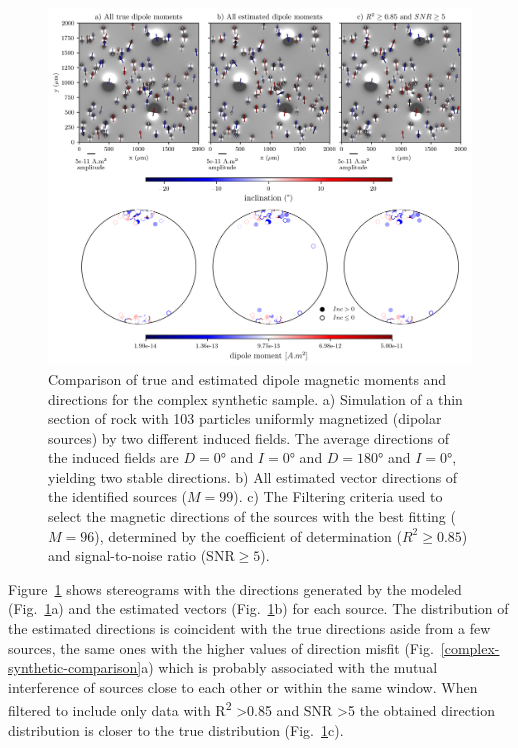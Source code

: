 \begin{figure}[tb!]
\centering
\includegraphics[width=1\linewidth]{figures/complex-synthetic-stereograms.png}
\caption{ Comparison of true and estimated dipole magnetic moments and directions for the complex synthetic sample.
a) Simulation of a thin section of rock with 103 particles uniformly magnetized (dipolar sources) by two different induced fields. The average directions of the induced fields are $D=\ang{0}$ and $I=\ang{0}$ and $D=\ang{180}$ and $I=\ang{0}$, yielding two stable directions. b) All estimated vector directions of the identified sources ($M=99$). c) The Filtering criteria used to select the magnetic directions of the sources with the best fitting ($M=96$), determined by the coefficient of determination ($R^2 \geq 0.85$) and signal-to-noise ratio ($\text{SNR} \geq 5$).
}
\label{complex-synthetic-stereograms}
\end{figure}

Figure~\ref{complex-synthetic-stereograms} shows stereograms with the directions generated by the modeled (Fig.~\ref{complex-synthetic-stereograms}a) and the estimated vectors (Fig.~\ref{complex-synthetic-stereograms}b) for each source. The distribution of the estimated directions is coincident with the true directions aside from a few sources, the same ones with the higher values of direction misfit (Fig.~\ref{complex-synthetic-comparison}a) which is probably associated with the mutual interference of sources close to each other or within the same window. When filtered to include only data with R\textsuperscript{2} \textgreater 0.85 and SNR \textgreater 5 the obtained direction distribution is closer to the true distribution (Fig.~\ref{complex-synthetic-stereograms}c).


